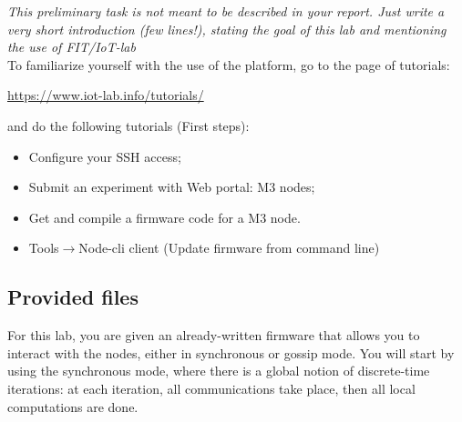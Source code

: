 \documentclass{article}
\begin{document}
\textit{\color{blue} This preliminary task is not meant to be described in your report. Just write a very short introduction (few lines!), stating the goal of this lab and mentioning the use of FIT/IoT-lab}\\


To familiarize yourself with the use of the platform, go to the page of tutorials:
\begin{center} \url{https://www.iot-lab.info/tutorials/} \end{center}
and do the following tutorials (First steps):
\begin{itemize}
\item Configure your SSH access;
\item Submit an experiment with Web portal: M3 nodes;
\item Get and compile a firmware code for a M3 node.
\item Tools$\to$Node-cli client (Update firmware from command line)
\end{itemize}

\subsection{Provided files}

For this lab, you are given
an already-written firmware that allows you to interact with the nodes, either in synchronous or gossip mode. You will start by using the synchronous mode, where  there is a global notion of discrete-time iterations: at each iteration, all communications take place, then all local computations are done.


\end{document}

